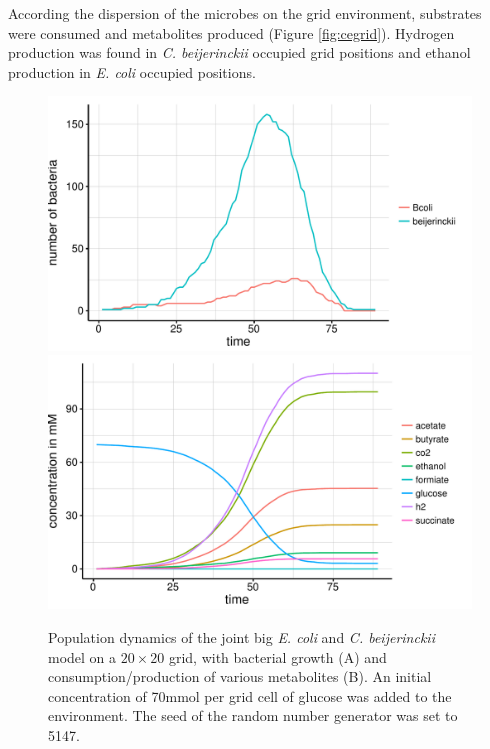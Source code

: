 According the dispersion of the microbes on the grid environment, substrates were consumed and metabolites produced (Figure \hyperref[fig:cegrid]{\ref{fig:cegrid}}). Hydrogen production was found in \textit{C. beijerinckii} occupied grid positions and ethanol production in \textit{E. coli} occupied positions.
\begin{figure}[h!]
  \centering
    \includegraphics[scale=0.45]{../results/ecoli_beijerinckii_20x20_seed5147_growth.pdf}
    \includegraphics[scale=0.45]{../results/ecoli_beijerinckii_20x20_seed5147_subs.pdf}
  \caption{Population dynamics of the joint big \emph{E. coli} and \emph{C. beijerinckii} model on a $20\times20$ grid, with bacterial growth (A) and consumption/production of various metabolites (B). An initial concentration of 70\;mmol per grid cell of glucose was added to the environment. The seed of the random number generator was set to 5147.}
  \label{fig:cesg}
\end{figure}
